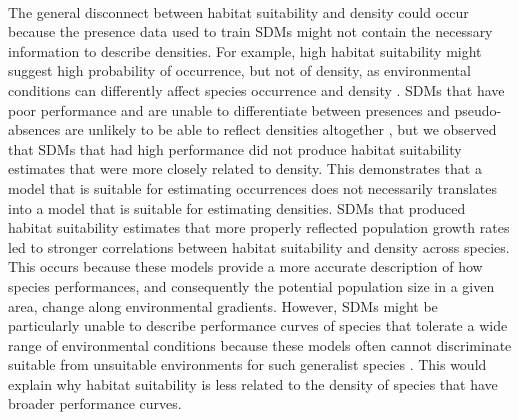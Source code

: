 \paragraph*{}
The general disconnect between habitat suitability and density could occur because the presence data used to train SDMs might not contain the necessary information to describe densities. For example, high habitat suitability might suggest high probability of occurrence, but not of density, as environmental conditions can differently affect species occurrence and density \parencite{bradley2016}. SDMs that have poor performance and are unable to differentiate between presences and pseudo-absences are unlikely to be able to reflect densities altogether \parencite{jimenez2021}, but we observed that SDMs that had high performance did not produce habitat suitability estimates that were more closely related to density. This demonstrates that a model that is suitable for estimating occurrences does not necessarily translates into a model that is suitable for estimating densities. SDMs that produced habitat suitability estimates that more properly reflected population growth rates led to stronger correlations between habitat suitability and density across species. This occurs because these models provide a more accurate description of how species performances, and consequently the potential population size in a given area, change along environmental gradients. However, SDMs might be particularly unable to describe performance curves of species that tolerate a wide range of environmental conditions because these models often cannot discriminate suitable from unsuitable environments for such generalist species \parencite{hernandez2006,franklin2009,van2016}. This would explain why habitat suitability is less related to the density of species that have broader performance curves. 
 

